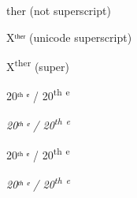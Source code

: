 \documentclass[12pt]{article}
\begin{document}
{\LARGE ther} (not superscript)

{\HUGE Xᵗʰᵉʳ} (unicode superscript)

{\HUGE X\textsuperscript{ther}} (super)

20ᵗʰ ᵉ /
20\textsuperscript{th} \textsuperscript{e}

\textit{%
20ᵗʰ ᵉ /
20\textsuperscript{th} \textsuperscript{e}
}

\textsf{%
20ᵗʰ ᵉ /
20\textsuperscript{th} \textsuperscript{e}
}

\textsf{\textit{%
20ᵗʰ ᵉ /
20\textsuperscript{th} \textsuperscript{e}
}}
\end{document}
